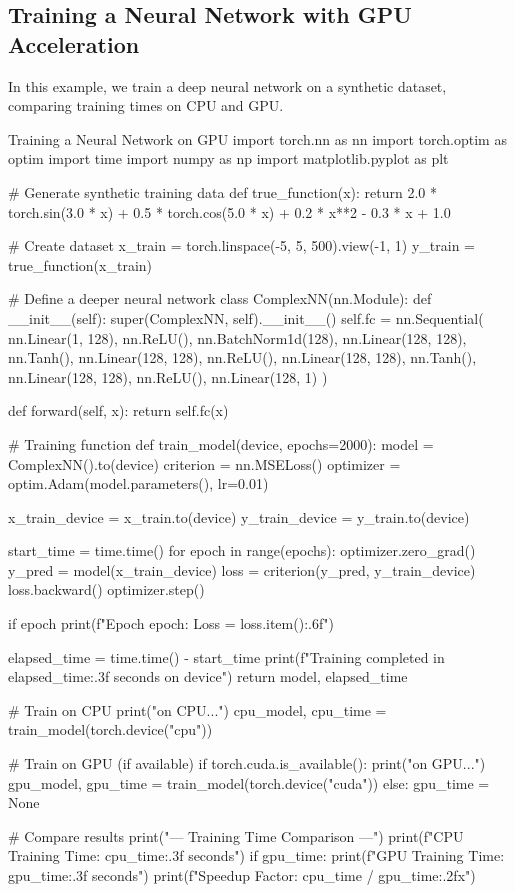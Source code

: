 \subsection{Training a Neural Network with GPU Acceleration}
In this example, we train a deep neural network on a synthetic dataset, comparing training times on CPU and GPU.

\begin{codeonly}{Training a Neural Network on GPU}
import torch.nn as nn
import torch.optim as optim
import time
import numpy as np
import matplotlib.pyplot as plt

# Generate synthetic training data
def true_function(x):
    return 2.0 * torch.sin(3.0 * x) + 0.5 * torch.cos(5.0 * x) + 0.2 * x**2 - 0.3 * x + 1.0

# Create dataset
x_train = torch.linspace(-5, 5, 500).view(-1, 1)
y_train = true_function(x_train)

# Define a deeper neural network
class ComplexNN(nn.Module):
    def __init__(self):
        super(ComplexNN, self).__init__()
        self.fc = nn.Sequential(
            nn.Linear(1, 128),
            nn.ReLU(),
            nn.BatchNorm1d(128),
            nn.Linear(128, 128),
            nn.Tanh(),
            nn.Linear(128, 128),
            nn.ReLU(),
            nn.Linear(128, 128),
            nn.Tanh(),
            nn.Linear(128, 128),
            nn.ReLU(),
            nn.Linear(128, 1)
        )
    
    def forward(self, x):
        return self.fc(x)

# Training function
def train_model(device, epochs=2000):
    model = ComplexNN().to(device)
    criterion = nn.MSELoss()
    optimizer = optim.Adam(model.parameters(), lr=0.01)
    
    x_train_device = x_train.to(device)
    y_train_device = y_train.to(device)
    
    start_time = time.time()
    for epoch in range(epochs):
        optimizer.zero_grad()
        y_pred = model(x_train_device)
        loss = criterion(y_pred, y_train_device)
        loss.backward()
        optimizer.step()
        
        if epoch %
            print(f"Epoch {epoch}: Loss = {loss.item():.6f}")
    
    elapsed_time = time.time() - start_time
    print(f"Training completed in {elapsed_time:.3f} seconds on {device}")
    return model, elapsed_time

# Train on CPU
print("\nTraining on CPU...")
cpu_model, cpu_time = train_model(torch.device("cpu"))

# Train on GPU (if available)
if torch.cuda.is_available():
    print("\nTraining on GPU...")
    gpu_model, gpu_time = train_model(torch.device("cuda"))
else:
    gpu_time = None

# Compare results
print("\n--- Training Time Comparison ---")
print(f"CPU Training Time: {cpu_time:.3f} seconds")
if gpu_time:
    print(f"GPU Training Time: {gpu_time:.3f} seconds")
    print(f"Speedup Factor: {cpu_time / gpu_time:.2f}x")
\end{codeonly}

